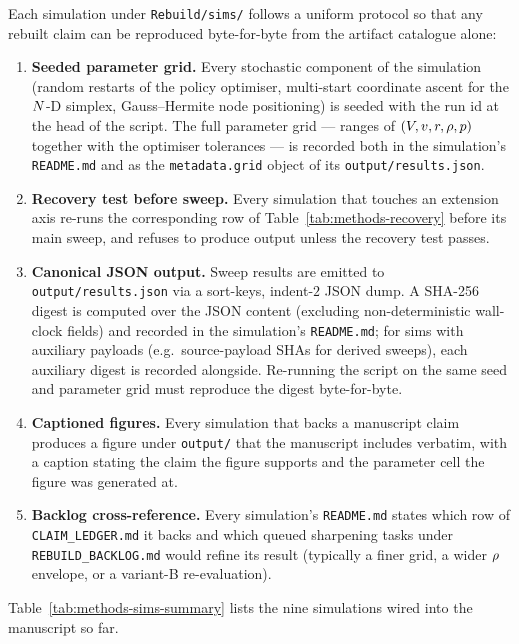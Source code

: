 Each simulation under \texttt{Rebuild/sims/} follows a uniform
protocol so that any rebuilt claim can be reproduced byte-for-byte
from the artifact catalogue alone:

\begin{enumerate}
  \item \textbf{Seeded parameter grid.}  Every stochastic component
    of the simulation (random restarts of the policy optimiser,
    multi-start coordinate ascent for the $N$-D simplex,
    Gauss--Hermite node positioning) is seeded with the run id at the
    head of the script.  The full parameter grid --- ranges of
    $(V, v, r, \rho, p)$ together with the optimiser
    tolerances --- is recorded both in the simulation's
    \texttt{README.md} and as the \texttt{metadata.grid} object of
    its \texttt{output/results.json}.
  \item \textbf{Recovery test before sweep.}  Every simulation that
    touches an extension axis re-runs the corresponding row of
    Table~\ref{tab:methods-recovery} before its main sweep, and
    refuses to produce output unless the recovery test passes.
  \item \textbf{Canonical JSON output.}  Sweep results are emitted to
    \texttt{output/results.json} via a sort-keys, indent-$2$ JSON
    dump.  A SHA-256 digest is computed over the JSON content
    (excluding non-deterministic wall-clock fields) and recorded in
    the simulation's \texttt{README.md}; for sims with auxiliary
    payloads (e.g.\ source-payload SHAs for derived sweeps), each
    auxiliary digest is recorded alongside.  Re-running the script
    on the same seed and parameter grid must reproduce the digest
    byte-for-byte.
  \item \textbf{Captioned figures.}  Every simulation that backs a
    manuscript claim produces a figure under \texttt{output/} that the
    manuscript includes verbatim, with a caption stating the claim
    the figure supports and the parameter cell the figure was
    generated at.
  \item \textbf{Backlog cross-reference.}  Every simulation's
    \texttt{README.md} states which row of \texttt{CLAIM\_LEDGER.md}
    it backs and which queued sharpening tasks under
    \texttt{REBUILD\_BACKLOG.md} would refine its result (typically
    a finer grid, a wider $\rho$ envelope, or a variant-B
    re-evaluation).
\end{enumerate}

Table~\ref{tab:methods-sims-summary} lists the nine simulations wired
into the manuscript so far.

